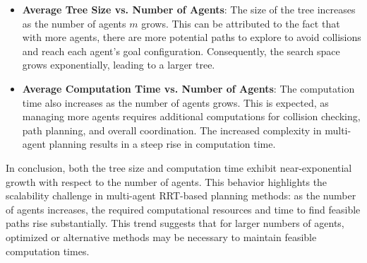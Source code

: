 \documentclass{article}
\begin{document}
\begin{itemize}
    \item \textbf{Average Tree Size vs. Number of Agents}: The size of the tree increases as the number of agents \( m \) grows. This can be attributed to the fact that with more agents, there are more potential paths to explore to avoid collisions and reach each agent's goal configuration. Consequently, the search space grows exponentially, leading to a larger tree.

    \item \textbf{Average Computation Time vs. Number of Agents}: The computation time also increases as the number of agents grows. This is expected, as managing more agents requires additional computations for collision checking, path planning, and overall coordination. The increased complexity in multi-agent planning results in a steep rise in computation time.
\end{itemize}

In conclusion, both the tree size and computation time exhibit near-exponential growth with respect to the number of agents. This behavior highlights the scalability challenge in multi-agent RRT-based planning methods: as the number of agents increases, the required computational resources and time to find feasible paths rise substantially. This trend suggests that for larger numbers of agents, optimized or alternative methods may be necessary to maintain feasible computation times.
\end{document}
